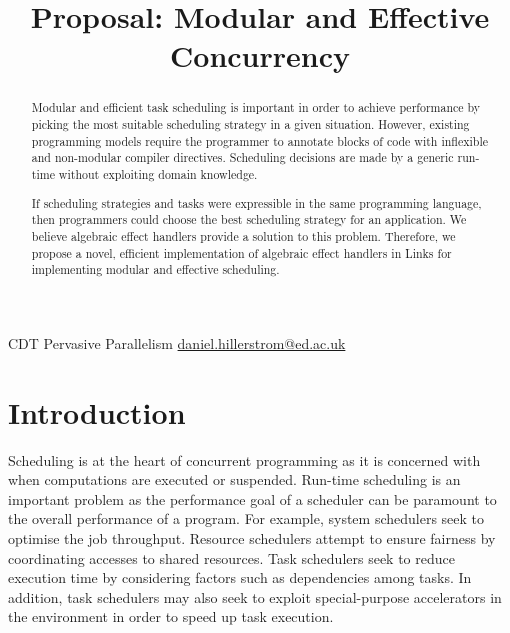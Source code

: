\documentclass[preprint,10pt,numbers]{sigplanconf}
\begin{document}
\title{Proposal: Modular and Effective Concurrency}

           {CDT Pervasive Parallelism}
           {\href{mailto:daniel.hillerstrom@ed.ac.uk}{daniel.hillerstrom@ed.ac.uk}}
  \maketitle
  \begin{abstract}
Modular and efficient task scheduling is important in order to achieve performance by picking the most suitable scheduling strategy in a given situation. However, existing programming models require the programmer to annotate blocks of code with inflexible and non-modular compiler directives. Scheduling decisions are made by a generic run-time without exploiting domain knowledge.

If scheduling strategies and tasks were expressible in the same programming language, then programmers could choose the best scheduling strategy for an application. We believe algebraic effect handlers provide a solution to this problem. Therefore, we propose a novel, efficient implementation of algebraic effect handlers in Links for implementing modular and effective scheduling.
  \end{abstract}
  \raggedbottom
  \section{Introduction}
Scheduling is at the heart of concurrent programming as it is concerned with when computations are executed or suspended. 
Run-time scheduling is an important problem as the performance goal of a scheduler can be paramount to the overall performance of a program. For example, system schedulers seek to optimise the job throughput. Resource schedulers attempt to ensure fairness by coordinating accesses to shared resources. Task schedulers seek to reduce execution time by considering factors such as dependencies among tasks. In addition, task schedulers may also seek to exploit special-purpose accelerators in the environment in order to speed up task execution.
\end{document}
